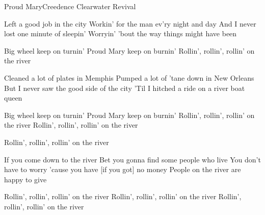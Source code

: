 \documentclass[a4paper,11pt,french]{article}
\begin{document}

\begin{Song}{Proud Mary}{Creedence Clearwater Revival}
\begin{multicols}{2}

\begin{Verse}
Left a good job in the city
Workin' for the man ev'ry night and day
And I never lost one minute of sleepin'
Worryin' 'bout the way things might have been
\end{Verse}
\espaceInterStrophe

\begin{Chorus}
Big wheel keep on turnin'
Proud Mary keep on burnin'
Rollin', rollin', rollin' on the river
\end{Chorus}
\espaceInterStrophe

\begin{Verse}
Cleaned a lot of plates in Memphis
Pumped a lot of 'tane down in New Orleans
But I never saw the good side of the city
'Til I hitched a ride on a river boat queen
\end{Verse}
\espaceInterStrophe

\begin{Chorus}
Big wheel keep on turnin'
Proud Mary keep on burnin'
Rollin', rollin', rollin' on the river
Rollin', rollin', rollin' on the river
\end{Chorus}
\columnbreak

\espaceInterStrophe

\espaceInterStrophe

\begin{Chorus}
Rollin', rollin', rollin' on the river
\end{Chorus}
\espaceInterStrophe

\espaceInterStrophe

\begin{Verse}
If you come down to the river
Bet you gonna find some people who live
You don't have to worry 'cause you have [if you got] no money
People on the river are happy to give
\end{Verse}
\espaceInterStrophe

\tochorus
\espaceInterStrophe

\begin{Chorus}
Rollin', rollin', rollin' on the river
Rollin', rollin', rollin' on the river
Rollin', rollin', rollin' on the river
\end{Chorus}


\end{multicols}
\end{Song}
\end{document}
